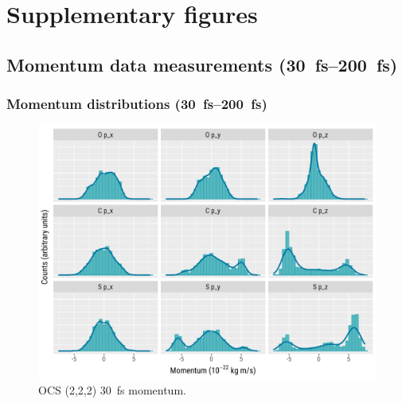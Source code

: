 \chapter{Supplementary figures}\label{appx:supplementaryFigures}

\section{Momentum data measurements (\SIrange{30}{200}{\femto\s})}

\subsection{Momentum distributions (\SIrange{30}{200}{\femto\s})}

\begin{figure}[H]
  \centering
  \includegraphics[width=\textwidth]{Plots/OCS22230fsMomentum}
  \caption[OCS (2,2,2) \SI{30}{\fs} momentum.]
  {OCS (2,2,2) \SI{30}{\fs} momentum.}
  \label{fig:OCS22230fsMomentum}
\end{figure}

